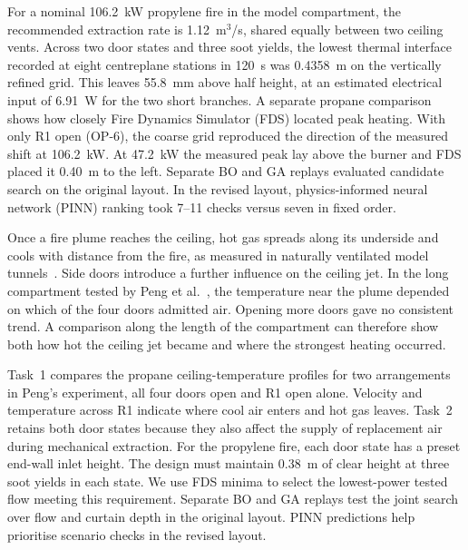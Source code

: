 For a nominal 106.2~kW propylene fire in the model compartment, the recommended extraction rate is 1.12~m$^3$/s, shared equally between two ceiling vents. Across two door states and three soot yields, the lowest thermal interface recorded at eight centreplane stations in 120~s was 0.4358~m on the vertically refined grid. This leaves 55.8~mm above half height, at an estimated electrical input of 6.91~W for the two short branches. A separate propane comparison shows how closely Fire Dynamics Simulator (FDS) located peak heating. With only R1 open (OP-6), the coarse grid reproduced the direction of the measured shift at 106.2~kW. At 47.2~kW the measured peak lay above the burner and FDS placed it 0.40~m to the left. Separate BO and GA replays evaluated candidate search on the original layout. In the revised layout, physics-informed neural network (PINN) ranking took 7--11 checks versus seven in fixed order.

Once a fire plume reaches the ceiling, hot gas spreads along its underside and cools with distance from the fire, as measured in naturally ventilated model tunnels~\cite{tunnel}. Side doors introduce a further influence on the ceiling jet. In the long compartment tested by Peng et al.~\cite{peng}, the temperature near the plume depended on which of the four doors admitted air. Opening more doors gave no consistent trend. A comparison along the length of the compartment can therefore show both how hot the ceiling jet became and where the strongest heating occurred.

Task~1 compares the propane ceiling-temperature profiles for two arrangements in Peng's experiment, all four doors open and R1 open alone. Velocity and temperature across R1 indicate where cool air enters and hot gas leaves. Task~2 retains both door states because they also affect the supply of replacement air during mechanical extraction. For the propylene fire, each door state has a preset end-wall inlet height. The design must maintain 0.38~m of clear height at three soot yields in each state. We use FDS minima to select the lowest-power tested flow meeting this requirement. Separate BO and GA replays test the joint search over flow and curtain depth in the original layout. PINN predictions help prioritise scenario checks in the revised layout.
